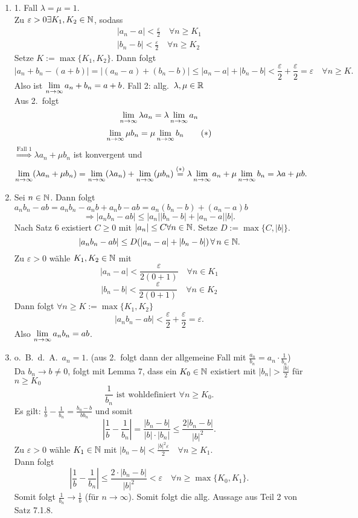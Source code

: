 \documentclass[../ana1.tex]{subfiles}
\begin{document}
\begin{bew}
	\begin{enumerate}
		\item 1. Fall \(\lambda = \mu = 1\).\\
		Zu \(\varepsilon>0 \exists K_1, K_2 \in\mathbb{N} \), sodass
		\begin{align*}
			|a_n-a|<\frac{\varepsilon}{2} \quad \forall n\geq K_1\\
			|b_n-b|<\frac{\varepsilon}{2} \quad \forall n\geq K_2
		\end{align*}
		Setze \(K := \max \{K_1, K_2\} \). Dann folgt 
		\[|a_n + b_n - (a+b)| = |(a_n-a)+(b_n-b)| \leq |a_n-a|+|b_n-b| < \frac{\varepsilon}{2} + \frac{\varepsilon}{2} = \varepsilon \quad \forall n\geq K.\]
		Also ist \(\lim\limits_{n\rightarrow\infty}a_n+b_n=a+b\).
		Fall 2: allg.\  \(\lambda,\mu\in\mathbb{R} \) \\
		Aus 2.\ folgt 
		\[\lim\limits_{n\rightarrow\infty} \lambda a_n = \lambda \lim\limits_{n\rightarrow\infty} a_n\]
		\[\lim\limits_{n\rightarrow\infty} \mu b_n = \mu \lim\limits_{n\rightarrow\infty} b_n \qquad(*)\]
		\(\overset{\text{Fall 1}}{\Rightarrow} \lambda a_n + \mu b_n\) ist konvergent und 
		\[\lim\limits_{n\rightarrow\infty} (\lambda a_n + \mu b_n) = \lim\limits_{n\rightarrow\infty} (\lambda a_n) + \lim\limits_{n\rightarrow\infty} (\mu b_n) \overset{(*)}{=} \lambda \lim\limits_{n\rightarrow\infty} a_n + \mu \lim\limits_{n\rightarrow\infty} b_n = \lambda a + \mu b.\]
		\item Sei \(n\in\mathbb{N} \). Dann folgt \(a_n b_n-ab = a_n b_n -a_n b + a_n b - ab=a_n(b_n-b)+(a_n-a)b\)
		\[\Rightarrow |a_n b_n -ab|\leq |a_n| |b_n-b| + |a_n-a||b|.\]
		Nach Satz 6 existiert \(C\geq 0\) mit \(|a_n|\leq C \forall n\in\mathbb{N} \). Setze \(D:= \max \{C, |b|\} \).
		\[|a_n b_n - ab| \leq D(|a_n-a|+|b_n-b|) \,\forall \, n\in\mathbb{N}.\]
		Zu \(\varepsilon > 0\) wähle \(K_1,K_2\in\mathbb{N} \) mit 
		\[|a_n-a|<\frac{\varepsilon}{2(0+1)} \quad \forall n\in K_1\]
		\[|b_n-b|<\frac{\varepsilon}{2(0+1)} \quad \forall n\in K_2\]
		Dann folgt \(\forall n\geq K := \max \{K_1, K_2\} \)
		\[|a_n b_n - ab|<\frac{\varepsilon}{2} + \frac{\varepsilon}{2} = \varepsilon.\]
		Also \(\lim\limits_{n\rightarrow\infty} a_n b_n = ab\).
		\item o.\ B.\ d.\ A.\  \(a_n = 1\). (aus 2.\ folgt dann der allgemeine Fall mit \( \frac{a_n}{b_n} = a_n \cdot\frac{1}{b_n} \))\\
		Da \(b_n \rightarrow b \neq 0\), folgt mit Lemma 7, dass ein \(K_0\in\mathbb{N} \) existiert mit \(|b_n| >\frac{|b|}{2} \) für \(n\geq K_0\) 
		\[\frac{1}{b_n} \text{ ist wohldefiniert } \forall n\geq K_0.\]
		Es gilt: \( \frac{1}{b} - \frac{1}{b_n} = \frac{b_n - b}{b b_n} \) und somit 
		\[ \left| \frac{1}{b} - \frac{1}{b_n} \right| = \frac{|b_n-b|}{|b| \cdot |b_n|} \leq \frac{2 |b_n - b|}{|b|^2}. \]
		Zu \(\varepsilon >0 \) wähle \(K_1 \in \mathbb{N} \) mit \(|b_n - b| < \frac{|b|^2\varepsilon}{2} \quad \forall n\geq K_1 \).\\
		Dann folgt 
		\[ \left| \frac{1}{b} - \frac{1}{b_n} \right| \leq \frac{2 \cdot |b_n - b|}{|b|^2} < \varepsilon \quad \forall n\geq\max \{ K_0,K_1\}. \]
		Somit folgt \( \frac{1}{b_n} \rightarrow \frac{1}{b} \) (für \(n\rightarrow \infty \)). Somit folgt die allg. Aussage aus Teil 2 von Satz 7.1.8.
	\end{enumerate}
\end{bew}
\end{document}
